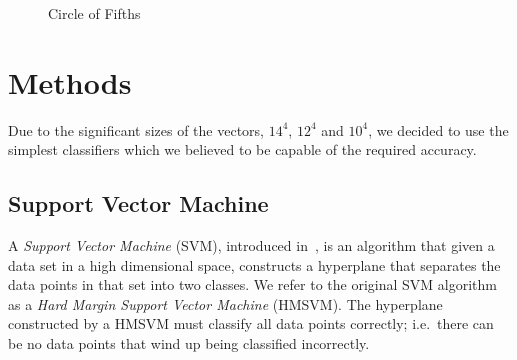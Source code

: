 \documentclass[twocolumn,dvipsnames]{article}
\begin{document}
\begin{figure}[h!]
    \centering
    \caption{Circle of Fifths}\label{fig:circleoffifths}
\end{figure}

\section{Methods}

Due to the significant sizes of the vectors, $14^4$, $12^4$ and $10^4$,
we decided to use the simplest classifiers which we believed to be capable of
the required accuracy.

\subsection{Support Vector Machine}
A \textit{Support Vector Machine} (SVM),
introduced in~\cite{vapnik1963pattern},
is an algorithm that given a data set in a high dimensional space,
constructs a hyperplane that separates the data points in that set into two classes.
We refer to the original SVM algorithm as a \textit{Hard Margin Support Vector Machine} (HMSVM).
The hyperplane constructed by a HMSVM must classify all data points correctly;
i.e.\ there can be no data points that wind up being classified incorrectly.
\end{document}
